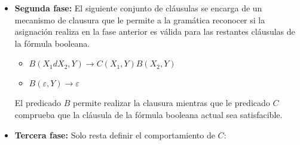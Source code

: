 \documentclass{article}
\begin{document}
\begin{itemize}
    \item \textbf{Segunda fase:} El siguiente conjunto de cláusulas se encarga de un mecanismo de clausura que le permite a la gramática
          reconocer si la asignación realiza en la fase anterior es válida para las restantes cláusulas de la fórmula
          booleana.
          \begin{itemize}
              \item $B(X_1dX_2,Y)\to C(X_1,Y) B(X_2,Y)$
              \item $B(\varepsilon,Y)\to\varepsilon$
          \end{itemize}
          
          El predicado $B$ permite realizar la clausura mientras que le predicado $C$ comprueba que la cláusula de la fórmula
          booleana actual sea satisfacible.
          
    \item \textbf{Tercera fase:} Solo resta definir el comportamiento de $C$:
          \begin{itemize}
          \end{itemize}
          

\end{itemize}
\end{document}
